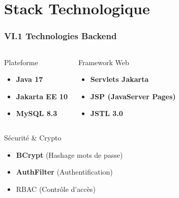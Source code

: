 \documentclass[11pt, aspectratio=169]{beamer}
\begin{document}

\section{Stack Technologique}

\begin{frame}
    \frametitle{VI.1 Technologies Backend}
    
    \begin{columns}[T]
        \begin{block}{Plateforme}
            \begin{itemize}
                \item[\faJava] \textbf{Java 17}
                \item[\faCode] \textbf{Jakarta EE 10}
                \item[\faDatabase] \textbf{MySQL 8.3}
            \end{itemize}
        \end{block}
        
        \begin{block}{Framework Web}
            \begin{itemize}
                \item[\faServer] \textbf{Servlets Jakarta}
                \item[\faFileAlt] \textbf{JSP (JavaServer Pages)}
                \item[\faTag] \textbf{JSTL 3.0}
            \end{itemize}
        \end{block}
    \end{columns}
    
    \vspace{1cm}
    
    \begin{columns}[T]
        \begin{block}{Sécurité \& Crypto}
            \begin{itemize}
                \item[\faLock] \textbf{BCrypt} (Hashage mots de passe)
                \item[\faShield] \textbf{AuthFilter} (Authentification)
                \item[\faUserLock] RBAC (Contrôle d'accès)
            \end{itemize}
        \end{block}
        

\end{columns}
\end{frame}
\end{document}
